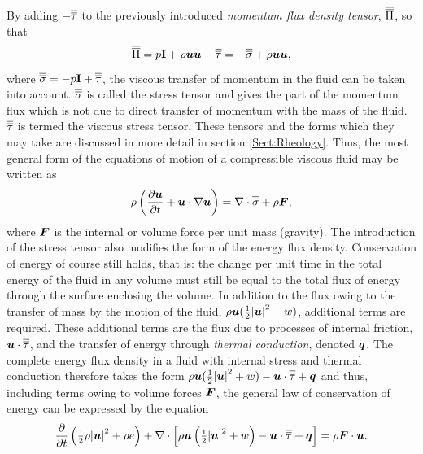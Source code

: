 By adding $-\overline{\overline{\tau}}$ to the previously introduced \textit{momentum flux density tensor}, $\overline{\overline{\Pi}}$, so that
\begin{equation}
 \overline{\overline{\Pi}}=p\mathbf{I}+\rho{\mbox{\boldmath$u$}}{\mbox{\boldmath$u$}}-\overline{\overline{\tau}}=-\overline{\overline{\sigma}}+\rho{\mbox{\boldmath$u$}}{\mbox{\boldmath$u$}},
\end{equation}
where $\overline{\overline{\sigma}}=-p\mathbf{I}+\overline{\overline{\tau}}$, the viscous transfer of momentum in the fluid can be taken into account. $\overline{\overline{\sigma}}$ is called the stress tensor and gives the part of the momentum flux which is not due to direct transfer of momentum with the mass of the fluid. $\overline{\overline{\tau}}$ is termed the viscous stress tensor. These tensors and the forms which they may take are discussed in more detail in section \ref{Sect:Rheology}. Thus, the most general form of the equations of motion of a compressible viscous fluid may be written as
\begin{equation}\label{viscous_fluids_1}
 \rho\left(\frac{\partial{\mbox{\boldmath$u$}}}{\partial{t}}+{\mbox{\boldmath$u$}}\cdot\nabla{\mbox{\boldmath$u$}}\right)=\nabla\cdot\overline{\overline{\sigma}}+\rho{\mbox{\boldmath$F$}},
\end{equation}
where ${\mbox{\boldmath$F$}}$ is the internal or volume force per unit mass (\eg gravity). The introduction of the stress tensor also modifies the form of the energy flux density. Conservation of energy of course still holds, that is: the change per unit time in the total energy of the fluid in any volume must still be equal to the total flux of energy through the surface enclosing the volume. In addition to the flux owing to the transfer of mass by the motion of the fluid, $\rho{\mbox{\boldmath$u$}}({\textstyle \frac{1}{2}}{|{\mbox{\boldmath$u$}}|}^{2}+w)$, additional terms are required. These additional terms are the flux due to processes of internal friction, ${\mbox{\boldmath$u$}}\cdot\overline{\overline{\tau}}$, and the transfer of energy through \textit{thermal conduction}, denoted ${\mbox{\boldmath$q$}}$.
The complete energy flux density in a fluid with internal stress and thermal conduction therefore takes the form $\rho{\mbox{\boldmath$u$}}({\textstyle \frac{1}{2}}{|{\mbox{\boldmath$u$}}|}^{2}+w)-{\mbox{\boldmath$u$}}\cdot\overline{\overline{\tau}}+{\mbox{\boldmath$q$}}$ and thus, including terms owing to volume forces ${\mbox{\boldmath$F$}}$, the general law of conservation of energy can be expressed by the equation
\begin{equation}\label{viscous_fluids_2}
 \frac{\partial}{\partial{t}}\left({\textstyle \frac{1}{2}}\rho{|{\mbox{\boldmath$u$}}|}^{2}+\rho e\right)
 +\nabla\cdot\left[\rho{\mbox{\boldmath$u$}}\left({\textstyle \frac{1}{2}}{|{\mbox{\boldmath$u$}}|}^{2}+w\right)-{\mbox{\boldmath$u$}}\cdot\overline{\overline{\tau}}+{\mbox{\boldmath$q$}}\right]=\rho{\mbox{\boldmath$F$}}\cdot{\mbox{\boldmath$u$}}.
\end{equation}


